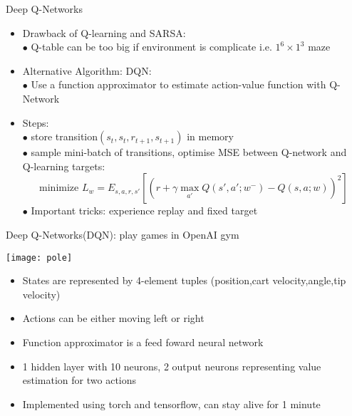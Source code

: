 \begin{frame}{Deep Q-Networks}
    \begin{itemize}
         \item Drawback of Q-learning and SARSA:\\
         \bigskip
         \hspace{0.5cm}$\bullet$ Q-table can be too big if environment is complicate i.e. $1^6\times1^3$ maze\\
         \bigskip
         \item Alternative Algorithm: DQN:\\
         \bigskip
         \hspace{0.5cm}$\bullet$ Use a function approximator to estimate action-value function with Q-Network\\
         \bigskip
         \item Steps:\\
         \bigskip
         \hspace{0.5cm}$\bullet$ store transition$(s_{t},s_{t},r_{t+1},s_{t+1})$ in memory\\
         \hspace{0.5cm}$\bullet$ sample mini-batch of transitions, optimise MSE between Q-network and \\
         \hspace{0.7cm} Q-learning targets:\\
         \begin{equation}
            \text{minimize  }  L_{w}=E_{s,a,r,s'}[(r+\gamma \max\limits_{a'}Q(s',a';w^{-})-Q(s,a;w))^2]
        \end{equation}
        \hspace{0.5cm}$\bullet$ Important tricks: experience replay and fixed target

    \end{itemize}
\end{frame}


\begin{frame}{Deep Q-Networks(DQN): play games in OpenAI gym}
    \begin{center}\texttt{[image: pole]}\end{center}
    \begin{itemize}
        \item States are represented by 4-element tuples (position,cart velocity,angle,tip velocity)
        \item Actions can be either moving left or right
        \item Function approximator is a feed foward neural network 
        \item 1 hidden layer with 10 neurons, 2 output neurons representing value estimation for two actions
        \item Implemented using torch and tensorflow, can stay alive for 1 minute
    \end{itemize}

\end{frame}







